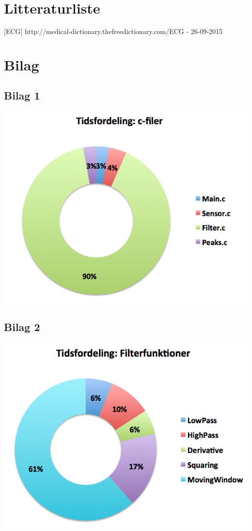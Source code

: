 \documentclass{article}
\begin{document}
\section{Litteraturliste}
[ECG] http://medical-dictionary.thefreedictionary.com/ECG - 26-09-2015

\newpage
\section{Bilag}
\subsection*{Bilag 1}
\includegraphics[scale=0.47]{c-filer.png}
\subsection*{Bilag 2}
\includegraphics[scale=0.49]{filter-funktioner.png}
\end{document}
